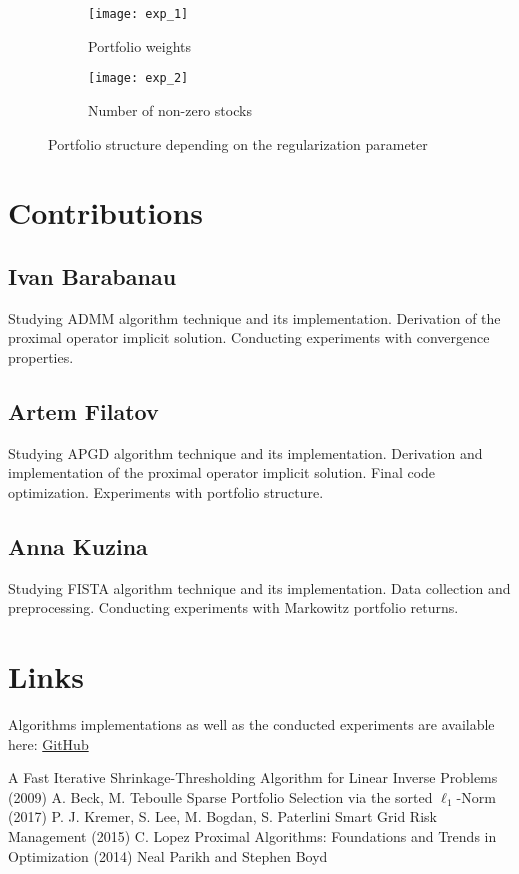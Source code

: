 \documentclass[a4paper]{article}
\begin{document}
\begin{figure}[!h]
\centering
\begin{subfigure}{.5\textwidth}
  \centering
  \texttt{[image: exp\_1]}
  \caption{Portfolio weights}
\end{subfigure}%
\begin{subfigure}{.5\textwidth}
  \centering
  \texttt{[image: exp\_2]} 
  \caption{Number of non-zero stocks}
\end{subfigure}
\caption{\label{fig:structure}Portfolio structure depending on the regularization parameter}
\end{figure}


\newpage
\section{Contributions}
\subsection{Ivan Barabanau}
Studying ADMM algorithm technique and its implementation. Derivation of the proximal operator implicit solution. Conducting experiments with convergence properties.
\subsection{Artem Filatov}
Studying APGD algorithm technique and its implementation. Derivation and implementation of the proximal operator implicit solution. Final code optimization. Experiments with portfolio structure.
\subsection{Anna Kuzina}
Studying FISTA algorithm technique and its implementation. Data collection and preprocessing. Conducting experiments with Markowitz portfolio returns.

\section{Links}
Algorithms implementations as well as the conducted experiments are available here: \href{https://github.com/FilatovArtm/optMarkowitz}{GitHub}
\begin{thebibliography}{} %
 A Fast Iterative Shrinkage-Thresholding Algorithm for Linear Inverse Problems (2009)
\newblock A. Beck, M. Teboulle
 Sparse Portfolio Selection via the sorted $\ell_1$-Norm (2017)
\newblock P. J. Kremer, S. Lee, M. Bogdan, S. Paterlini
 Smart Grid Risk Management (2015)
\newblock C. Lopez
 Proximal Algorithms: Foundations and Trends in Optimization (2014)
\newblock Neal Parikh and Stephen Boyd
\end{thebibliography}
\end{document}
